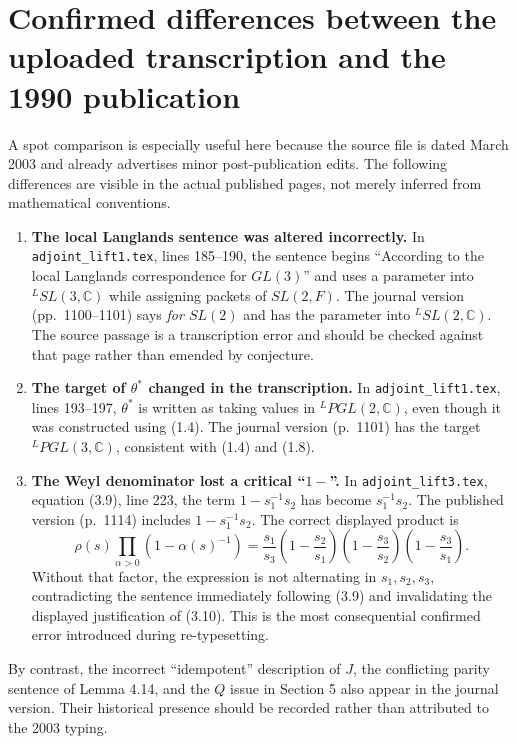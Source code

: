 \documentclass[12pt,letterpaper]{article}
\begin{document}
\section{Confirmed differences between the uploaded transcription and
the 1990 publication}

A spot comparison is especially useful here because the source file is
dated March 2003 and already advertises minor post-publication edits.
The following differences are visible in the actual published pages,
not merely inferred from mathematical conventions.

\begin{enumerate}[label=\arabic*.]
\item \textbf{The local Langlands sentence was altered incorrectly.}
In \texttt{adjoint\_lift1.tex}, lines 185--190, the sentence begins
``According to the local Langlands correspondence for $GL(3)$'' and
uses a parameter into ${}^L SL(3,\mathbb C)$ while assigning packets
of $SL(2,F)$. The journal version (pp.~1100--1101) says \emph{for
$SL(2)$} and has the parameter into ${}^L SL(2,\mathbb C)$.
The source passage is a transcription error and should be checked
against that page rather than emended by conjecture.

\item \textbf{The target of $\theta^*$ changed in the transcription.}
In \texttt{adjoint\_lift1.tex}, lines 193--197, $\theta^*$ is written
as taking values in ${}^L PGL(2,\mathbb C)$, even though it was
constructed using (1.4). The journal version (p.~1101) has the
target ${}^L PGL(3,\mathbb C)$, consistent with (1.4) and (1.8).

\item \textbf{The Weyl denominator lost a critical ``$1-$''.}
In \texttt{adjoint\_lift3.tex}, equation (3.9), line 223, the term
$1-s_1^{-1}s_2$ has become $s_1^{-1}s_2$. The published version
(p.~1114) includes $1-s_1^{-1}s_2$. The correct displayed product is
\[
\rho(s)\prod_{\alpha>0}(1-\alpha(s)^{-1})
=\frac{s_1}{s_3}
 \left(1-\frac{s_2}{s_1}\right)
 \left(1-\frac{s_3}{s_2}\right)
 \left(1-\frac{s_3}{s_1}\right).
\]
Without that factor, the expression is not alternating in $s_1,s_2,s_3$,
contradicting the sentence immediately following (3.9) and invalidating
the displayed justification of (3.10). This is the most consequential
confirmed error introduced during re-typesetting.
\end{enumerate}

By contrast, the incorrect ``idempotent'' description of $J$, the
conflicting parity sentence of Lemma 4.14, and the $Q$ issue in
Section 5 also appear in the journal version. Their historical
presence should be recorded rather than attributed to the 2003 typing.
\end{document}
